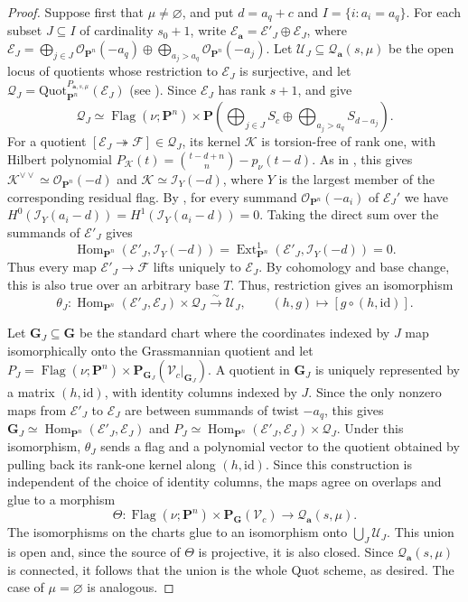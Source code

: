 \documentclass[leqno,11pt,a4paper]{amsart}
\theoremstyle{definition}
\numberwithin{equation}{section}
\newcommand{\bfa}{\mathbf{a}}
\newcommand{\Quot}{\mathrm{Quot}}
\newcommand{\PP}{\mathbf{P}}
\newcommand{\EE}{\mathscr{E}}
\newcommand{\FF}{\mathscr{F}}
\newcommand{\OO}{\mathscr{O}}
\newcommand{\II}{\mathscr{I}}
\newcommand{\KK}{\mathscr{K}}
\newcommand{\QQ}{\mathcal{Q}}
\newcommand{\UU}{\mathcal{U}}
\DeclareMathOperator{\Hom}{Hom}
\DeclareMathOperator{\Ext}{Ext}
\DeclareMathOperator{\Flag}{Flag}
\begin{document}
\begin{proof}
Suppose first that $\mu\ne\varnothing$, and put $d=a_q+c$ and $I=\{i:a_i=a_q\}$.
For each subset $J\subseteq I$ of cardinality $s_0+1$, write $\EE_{\bfa}=\EE'_J\oplus\EE_J$, where
$\EE_J= \bigoplus_{j\in J}\OO_{\PP^n}(-a_q) \oplus\bigoplus_{a_j>a_q}\OO_{\PP^n}(-a_j)$.
Let $\UU_{J} \subseteq\QQ_{\bfa}(s,\mu)$ be the open locus of quotients whose restriction to $\EE_J$ is surjective, and let $ \QQ_J=\Quot_{\PP^n}^{P_{\bfa,s,\mu}}(\EE_J)$ (see ).
Since $\EE_J$ has rank $s+1$,  and \cite[Theorem~3.2]{SS23} give
$$
\QQ_J\simeq \Flag(\nu;\PP^n) \times
\PP\left( \bigoplus_{j\in J}S_c \oplus\bigoplus_{a_j>a_q}S_{d-a_j}\right).
$$
For a quotient $[\EE_J\twoheadrightarrow\FF] \in \QQ_J$, its kernel $\KK$ is torsion-free of rank one, with Hilbert polynomial $P_{\KK}(t)=\binom{t-d+n}{n}-p_\nu(t-d)$.
As in , this gives $\KK^{\vee\vee}\simeq\OO_{\PP^n}(-d)$ and $\KK\simeq\II_Y(-d)$, where $Y$ is the largest member of the corresponding residual flag.
By , for every summand $\OO_{\PP^n}(-a_i)$ of $\EE_J'$ we have
$H^0(\II_Y(a_i-d))=H^1(\II_Y(a_i-d))=0$.
Taking the direct sum over the summands of $\EE'_J$ gives
$$
\Hom_{\PP^n}(\EE'_J,\II_Y(-d)) = \Ext^1_{\PP^n}(\EE'_J,\II_Y(-d)) =0.
$$
Thus every map $\EE'_J\to\FF$ lifts uniquely to $\EE_J$.
By cohomology and base change, this is also true over an arbitrary base $T$.
Thus, restriction gives an isomorphism
$$
\theta_J:
\Hom_{\PP^n}(\EE'_J,\EE_J)\times\QQ_J
\xrightarrow{\ \sim\ }\UU_J,
\qquad
(h,g)\longmapsto[g\circ(h,\mathrm{id})].
$$

Let $\mathbf G_J\subseteq\mathbf G$ be the standard chart where the coordinates indexed by $J$ map isomorphically onto the Grassmannian quotient and let $ P_J= \Flag(\nu;\PP^n)\times \PP_{\mathbf G_J}(\mathscr V_c|_{\mathbf G_J})$.
A quotient in $\mathbf G_J$ is uniquely represented by a matrix $(h,\mathrm{id})$, with identity columns indexed by $J$.
Since the only nonzero maps from $\EE'_J$ to $\EE_J$ are between summands of twist $-a_q$, this gives $\mathbf G_J\simeq\Hom_{\PP^n}(\EE'_J,\EE_J)$ and $P_J\simeq\Hom_{\PP^n}(\EE'_J,\EE_J)\times\QQ_J$.
Under this isomorphism, $\theta_J$ sends a flag and a polynomial vector to the quotient obtained by pulling back its rank-one kernel along $(h,\mathrm{id})$. 
Since this construction is independent of the choice of identity columns, the maps agree on overlaps and glue to a morphism
$$
\Theta: \Flag(\nu;\PP^n)\times\PP_{\mathbf G}(\mathscr V_c) \longrightarrow\QQ_{\bfa}(s,\mu).
$$
The isomorphisms on the charts glue to an isomorphism onto $\bigcup_J\UU_J$. 
This union is open and, since the source of $\Theta$ is projective, it is also closed.
Since $\QQ_{\bfa}(s,\mu)$ is connected, it follows that the union is the whole Quot scheme, as desired.
The case of $\mu = \varnothing$ is analogous.
\end{proof}
\end{document}
